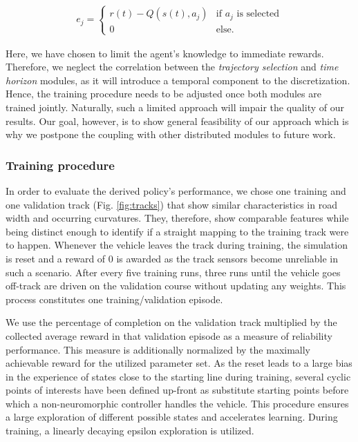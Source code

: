 \begin{align}
e_j = \begin{cases}
r(t) - Q(s(t),a_j) & \text{if } a_j \text{ is selected}\\
0 & \text{else}.
\end{cases}
\end{align}

Here, we have chosen to limit the agent's knowledge to immediate rewards.
Therefore, we neglect the correlation between the \emph{trajectory selection} and \emph{time horizon} modules, as it will introduce a temporal component to the discretization.
Hence, the training procedure needs to be adjusted once both modules are trained jointly.
Naturally, such a limited approach will impair the quality of our results.
Our goal, however, is to show general feasibility of our approach which is why we postpone the coupling with other distributed modules to future work.

\subsubsection{Training procedure}%
\label{ssubsec:training_procedure}

In order to evaluate the derived policy's performance, we chose one training and one validation track (Fig. \ref{fig:tracks}) that show similar characteristics in road width and occurring curvatures. They, therefore, show comparable features while being distinct enough to identify if a straight mapping to the training track were to happen.
Whenever the vehicle leaves the track during training, the simulation is reset and a reward of \num{0} is awarded as the track sensors become unreliable in such a scenario.
After every five training runs, three runs until the vehicle goes off-track are driven on the validation course without updating any weights. This process constitutes one training/validation episode.

We use the percentage of completion on the validation track multiplied by the collected average reward in that validation episode as a measure of reliability performance. 
This measure is additionally normalized by the maximally achievable reward for the utilized parameter set.
As the reset leads to a large bias in the experience of states close to the starting line during training, several cyclic points of interests have been defined up-front as substitute starting points before which a non-neuromorphic controller handles the vehicle.
This procedure ensures a large exploration of different possible states and accelerates learning. 
During training, a linearly decaying epsilon exploration is utilized.

